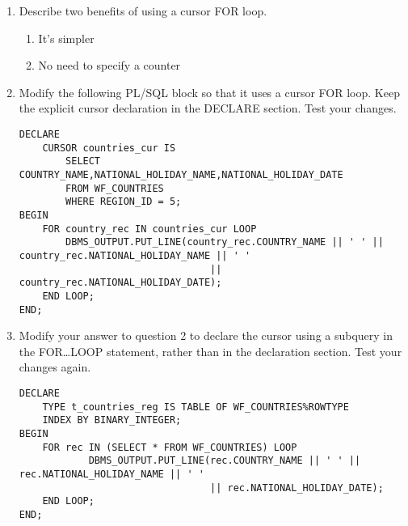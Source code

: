 \documentclass[11pt]{article}
\begin{document}
\begin{enumerate}
\item Describe two benefits of using a cursor FOR loop.
\begin{enumerate}
\item It's simpler
\item No need to specify a counter
\end{enumerate}

\item Modify the following PL/SQL block so that it uses a cursor FOR loop. Keep the explicit cursor declaration in the DECLARE section. Test your changes.
\begin{verbatim}
DECLARE
    CURSOR countries_cur IS
        SELECT COUNTRY_NAME,NATIONAL_HOLIDAY_NAME,NATIONAL_HOLIDAY_DATE
        FROM WF_COUNTRIES
        WHERE REGION_ID = 5;
BEGIN
    FOR country_rec IN countries_cur LOOP
        DBMS_OUTPUT.PUT_LINE(country_rec.COUNTRY_NAME || ' ' || country_rec.NATIONAL_HOLIDAY_NAME || ' '
                                 || country_rec.NATIONAL_HOLIDAY_DATE);
    END LOOP;
END;
\end{verbatim}
\item Modify your answer to question 2 to declare the cursor using a subquery in the FOR…LOOP statement, rather than in the declaration section. Test your changes again.
\begin{verbatim}
DECLARE
    TYPE t_countries_reg IS TABLE OF WF_COUNTRIES%ROWTYPE
    INDEX BY BINARY_INTEGER;
BEGIN
    FOR rec IN (SELECT * FROM WF_COUNTRIES) LOOP
            DBMS_OUTPUT.PUT_LINE(rec.COUNTRY_NAME || ' ' || rec.NATIONAL_HOLIDAY_NAME || ' '
                                 || rec.NATIONAL_HOLIDAY_DATE);
    END LOOP;
END;
\end{verbatim}


\end{enumerate}
\end{document}
